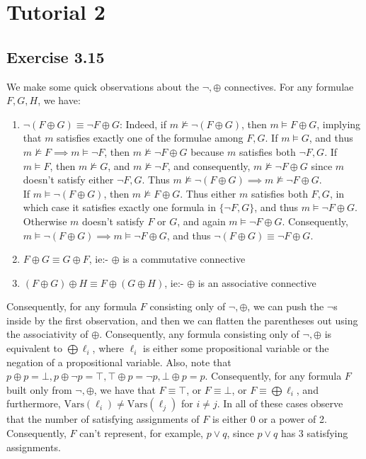 \documentclass{article}
\newcommand{\Vars}{\mathrm{Vars}}
\begin{document}
\section{Tutorial 2}
\subsection*{Exercise 3.15}
We make some quick observations about the $\lnot, \oplus$ connectives. For any formulae $F, G, H$, we have:
\begin{enumerate}
    \item $\lnot(F\oplus G) \equiv \lnot F\oplus G$: Indeed, if $m\not\models \lnot(F\oplus G)$, then $m\models F\oplus G$, implying that $m$ satisfies exactly one of the formulae among $F, G$. If $m\models G$, and thus $m\not\models F\implies m\models\lnot F$, then $m\not\models\lnot F\oplus G$ because $m$ satisfies both $\lnot F, G$. If $m\models F$, then $m\not\models G$, and $m\not\models\lnot F$, and consequently, $m\not\models\lnot F\oplus G$ since $m$ doesn't satisfy either $\lnot F, G$. Thus $m\not\models\lnot(F\oplus G)\implies m\not\models\lnot F\oplus G$.\\
    If $m\models\lnot(F\oplus G)$, then $m\not\models F\oplus G$. Thus either $m$ satisfies both $F, G$, in which case it satisfies exactly one formula in $\{\lnot F, G\}$, and thus $m\models\lnot F\oplus G$. Otherwise $m$ doesn't satisfy $F$ or $G$, and again $m\models\lnot F\oplus G$. Consequently, $m\models\lnot(F\oplus G)\implies m\models\lnot F\oplus G$, and thus $\lnot(F\oplus G)\equiv\lnot F\oplus G$.
    \item $F\oplus G\equiv G\oplus F$, ie:- $\oplus$ is a commutative connective
    \item $(F\oplus G)\oplus H \equiv F\oplus (G\oplus H)$, ie:- $\oplus$ is an associative connective
\end{enumerate}
Consequently, for any formula $F$ consisting only of $\lnot, \oplus$, we can push the $\lnot$s inside by the first observation, and then we can flatten the parentheses out using the associativity of $\oplus$. Consequently, any formula consisting only of $\lnot, \oplus$ is equivalent to $\bigoplus\ell_i$, where $\ell_i$ is either some propositional variable or the negation of a propositional variable. Also, note that $p\oplus p = \bot, p\oplus\lnot p = \top, \top\oplus p = \lnot p, \bot\oplus p = p$. Consequently, for any formula $F$ built only from $\lnot, \oplus$, we have that $F\equiv\top$, or $F\equiv\bot$, or $F\equiv\bigoplus\ell_i$, and furthermore, $\Vars(\ell_i)\neq\Vars(\ell_j)$ for $i\neq j$. In all of these cases observe that the number of satisfying assignments of $F$ is either $0$ or a power of 2. Consequently, $F$ can't represent, for example, $p\lor q$, since $p\lor q$ has 3 satisfying assignments.
\end{document}
